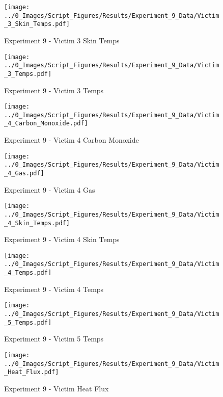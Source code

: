 	\clearpage

	\begin{figure}[H]
		\centering
		\texttt{[image: ../0\_Images/Script\_Figures/Results/Experiment\_9\_Data/Victim\_3\_Skin\_Temps.pdf]}
		\caption[]{Experiment 9 - Victim 3 Skin Temps}
	\end{figure}
 

	\begin{figure}[H]
		\centering
		\texttt{[image: ../0\_Images/Script\_Figures/Results/Experiment\_9\_Data/Victim\_3\_Temps.pdf]}
		\caption[]{Experiment 9 - Victim 3 Temps}
	\end{figure}
 
	\clearpage

	\begin{figure}[H]
		\centering
		\texttt{[image: ../0\_Images/Script\_Figures/Results/Experiment\_9\_Data/Victim\_4\_Carbon\_Monoxide.pdf]}
		\caption[]{Experiment 9 - Victim 4 Carbon Monoxide}
	\end{figure}
 

	\begin{figure}[H]
		\centering
		\texttt{[image: ../0\_Images/Script\_Figures/Results/Experiment\_9\_Data/Victim\_4\_Gas.pdf]}
		\caption[]{Experiment 9 - Victim 4 Gas}
	\end{figure}
 
	\clearpage

	\begin{figure}[H]
		\centering
		\texttt{[image: ../0\_Images/Script\_Figures/Results/Experiment\_9\_Data/Victim\_4\_Skin\_Temps.pdf]}
		\caption[]{Experiment 9 - Victim 4 Skin Temps}
	\end{figure}
 

	\begin{figure}[H]
		\centering
		\texttt{[image: ../0\_Images/Script\_Figures/Results/Experiment\_9\_Data/Victim\_4\_Temps.pdf]}
		\caption[]{Experiment 9 - Victim 4 Temps}
	\end{figure}
 
	\clearpage

	\begin{figure}[H]
		\centering
		\texttt{[image: ../0\_Images/Script\_Figures/Results/Experiment\_9\_Data/Victim\_5\_Temps.pdf]}
		\caption[]{Experiment 9 - Victim 5 Temps}
	\end{figure}
 

	\begin{figure}[H]
		\centering
		\texttt{[image: ../0\_Images/Script\_Figures/Results/Experiment\_9\_Data/Victim\_Heat\_Flux.pdf]}
		\caption[]{Experiment 9 - Victim Heat Flux}
	\end{figure}
 
